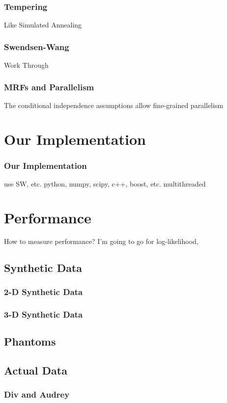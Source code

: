 \documentclass{beamer}
\begin{document}
\begin{frame}
  \frametitle{Tempering} 
  Like Simulated Annealing
\end{frame}

\begin{frame}
  \frametitle{Swendsen-Wang}
  Work Through
\end{frame}

\begin{frame}
  \frametitle{MRFs and Parallelism}
  The conditional independence assumptions allow fine-grained parallelism
  
\end{frame}

\section{Our Implementation}
\begin{frame}
  \frametitle{Our Implementation}
  use SW, etc. 
  python, numpy, scipy, c++, boost, etc. 
  multithreaded
\end{frame}

\section{Performance}

How to measure performance? I'm going to go for 
log-likelihood, 


\subsection{Synthetic Data}
\begin{frame}
  \frametitle{2-D Synthetic Data}
\end{frame}

\begin{frame}
  \frametitle{3-D Synthetic Data}
\end{frame}

\subsection{Phantoms}

\subsection{Actual Data}
\begin{frame}
  \frametitle{Div and Audrey}
\end{frame}
\end{document}
